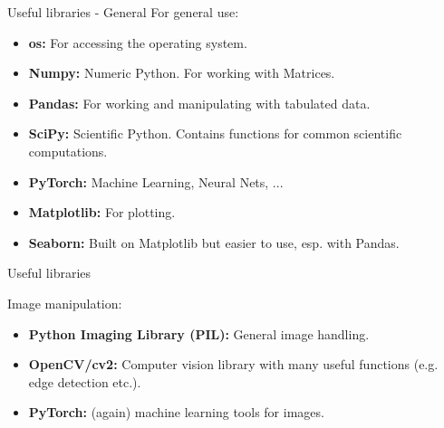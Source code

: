 \documentclass[compress%
,aspectratio=169%
]{beamer}
\begin{document}
\begin{frame}{Useful libraries - General}
    For general use:
    \begin{itemize}
        \item \textbf{os:} For accessing the operating system.
        \item \textbf{Numpy:} Numeric Python. For working with Matrices.
        \item \textbf{Pandas:} For working and manipulating with tabulated data.
        \item \textbf{SciPy:} Scientific Python. Contains functions for common scientific computations.
        \item \textbf{PyTorch:} Machine Learning, Neural Nets, ...
        \item \textbf{Matplotlib:} For plotting.
        \item \textbf{Seaborn:} Built on Matplotlib but easier to use, esp. with Pandas.
    \end{itemize}
\end{frame}

\begin{frame}{Useful libraries}

    Image manipulation:
    \begin{itemize}
        \item \textbf{Python Imaging Library (PIL):} General image handling.
        \item \textbf{OpenCV/cv2:} Computer vision library with many useful functions (e.g. edge detection etc.).
        \item \textbf{PyTorch:} (again) machine learning tools for images.
    \end{itemize}
\end{frame}
\end{document}
